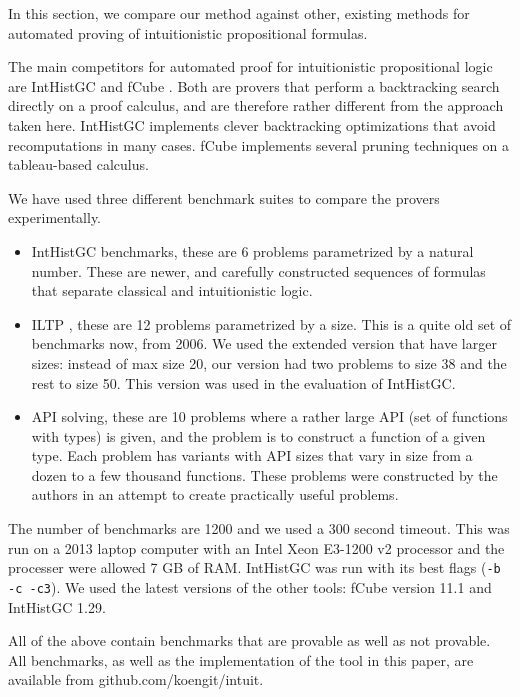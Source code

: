 \documentclass{llncs}
\begin{document}
In this section, we compare our method against other, existing methods for automated proving of intuitionistic propositional formulas.

The main competitors for automated proof for intuitionistic propositional logic are IntHistGC \cite{rajeev} and fCube \cite{fcube}. Both are provers that perform a backtracking search directly on a proof calculus, and are therefore rather different from the approach taken here. IntHistGC implements clever backtracking optimizations that avoid recomputations in many cases. fCube implements several pruning techniques on a tableau-based calculus.

We have used three different benchmark suites to compare the provers experimentally.

\begin{itemize}
\item IntHistGC benchmarks, these are 6 problems parametrized by a natural number. These are newer, and carefully constructed sequences of formulas that separate classical and intuitionistic logic.
\item ILTP \cite{iltp}, these are 12 problems parametrized by a size. This is a quite old set of benchmarks now, from 2006.
We used the extended version that have larger sizes: instead of max size 20, our version had two problems to size 38 and the rest to size 50. This version was used in the evaluation of IntHistGC.
\item API solving, these are 10 problems where a rather large API (set of functions with types) is given, and the problem is to construct a function of a given type. Each problem has variants with API sizes that vary in size from a dozen to a few thousand functions. These problems were constructed by the authors in an attempt to create practically useful problems.
\end{itemize}

The number of benchmarks are 1200 and we used a 300 second timeout. This was run on a 2013 laptop computer
with an Intel Xeon E3-1200 v2 processor and the processer were allowed 7 GB of RAM.
IntHistGC was run with its best flags ({\tt -b -c -c3}). We used the latest versions of the other tools: fCube version 11.1
and IntHistGC 1.29.

All of the above contain benchmarks that are provable as well as not provable. All benchmarks, as well as the implementation of the tool in this paper, are available from {\sf github.com/koengit/intuit}.

~\\ $\;$
\end{document}
